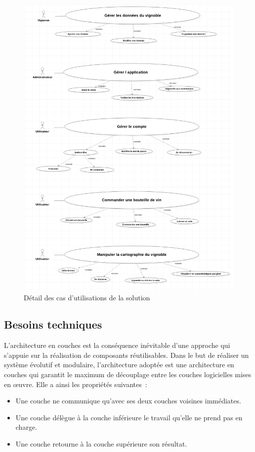 \documentclass[a4paper, titlepage]{report}
\begin{document}
\begin{figure}[!ht]
\centering
\includegraphics{Images/UseCaseDiagramDetailSolution.png}
\caption{Détail des cas d'utilisations de la solution}
\end{figure}

\clearpage
\subsection{Besoins techniques}\label{besoins-techniques}

L'architecture en couches est la conséquence inévitable d'une approche
qui s'appuie sur la réalisation de composants réutilisables. Dans le but
de réaliser un système évolutif et modulaire, l'architecture adoptée est
une architecture en couches qui garantit le maximum de découplage entre
les couches logicielles mises en œuvre. Elle a ainsi les propriétés
suivantes~: 
\begin{itemize}
\item Une couche ne communique qu'avec ses deux couches voisines immédiates. 
\item Une couche délègue à la couche inférieure le travail qu'elle ne prend pas en charge. 
\item Une couche retourne à la couche supérieure son résultat.
\end{itemize}
\end{document}
